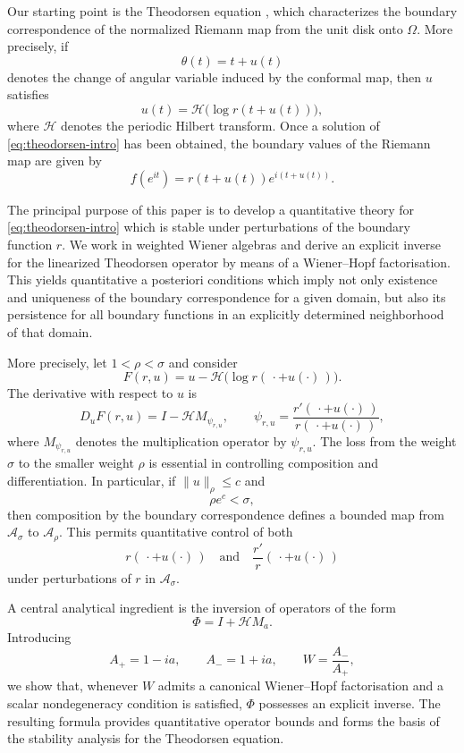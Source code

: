 \documentclass[11pt,a4paper]{amsart}
\begin{document}
Our starting point is the Theodorsen equation \cite{Theodorsen}, which characterizes the
boundary correspondence of the normalized Riemann map from the unit
disk onto $\Omega$. More precisely, if
\[
\theta(t)=t+u(t)
\]
denotes the change of angular variable induced by the conformal map,
then $u$ satisfies
\begin{equation}\label{eq:theodorsen-intro}
	u(t)
	=
	\mathcal H\bigl(\log r(t+u(t))\bigr),
\end{equation}
where $\mathcal H$ denotes the periodic Hilbert transform. Once a
solution of \eqref{eq:theodorsen-intro} has been obtained, the boundary
values of the Riemann map are given by
\begin{equation}\label{eq:boundary-riemann-intro}
	f(e^{it})
	=
	r(t+u(t))e^{i(t+u(t))}.
\end{equation}

The principal purpose of this paper is to develop a quantitative theory
for \eqref{eq:theodorsen-intro} which is stable under perturbations of
the boundary function $r$. We work in weighted Wiener algebras and
derive an explicit inverse for the linearized Theodorsen operator by
means of a Wiener--Hopf factorisation. This yields quantitative
a posteriori conditions which imply not only existence and uniqueness
of the boundary correspondence for a given domain, but also its
persistence for all boundary functions in an explicitly determined
neighborhood of that domain.

More precisely, let $1<\rho<\sigma$ and consider
\[
F(r,u)
=
u-\mathcal H\bigl(\log r(\,\cdot+u(\cdot)\,)\bigr).
\]
The derivative with respect to $u$ is
\[
D_uF(r,u)
=
I-\mathcal H M_{\psi_{r,u}},\qquad
\psi_{r,u}=\frac{r'(\,\cdot+u(\cdot)\,)}{r(\,\cdot+u(\cdot)\,)},
\]
where $M_{\psi_{r,u}}$ denotes the multiplication operator by $\psi_{r,u}$.
The loss from the weight $\sigma$ to the smaller weight $\rho$ is
essential in controlling composition and differentiation. In
particular, if $\|u\|_\rho\leq c$ and
\[
\rho e^c<\sigma,
\]
then composition by the boundary correspondence defines a bounded map
from $\mathcal A_\sigma$ to $\mathcal A_\rho$. This permits quantitative
control of both
\[
r(\,\cdot+u(\cdot)\,)
\quad\text{and}\quad
\frac{r'}{r}(\,\cdot+u(\cdot)\,)
\]
under perturbations of $r$ in $\mathcal A_\sigma$.

A central analytical ingredient is the inversion of operators of the
form
\[
\Phi=I+\mathcal H M_a.
\]
Introducing
\[
A_+=1-ia,
\qquad
A_-=1+ia,
\qquad
W=\frac{A_-}{A_+},
\]
we show that, whenever $W$ admits a canonical Wiener--Hopf
factorisation and a scalar nondegeneracy condition is satisfied,
$\Phi$ possesses an explicit inverse. The resulting formula provides
quantitative operator bounds and forms the basis of the stability
analysis for the Theodorsen equation.
\end{document}
